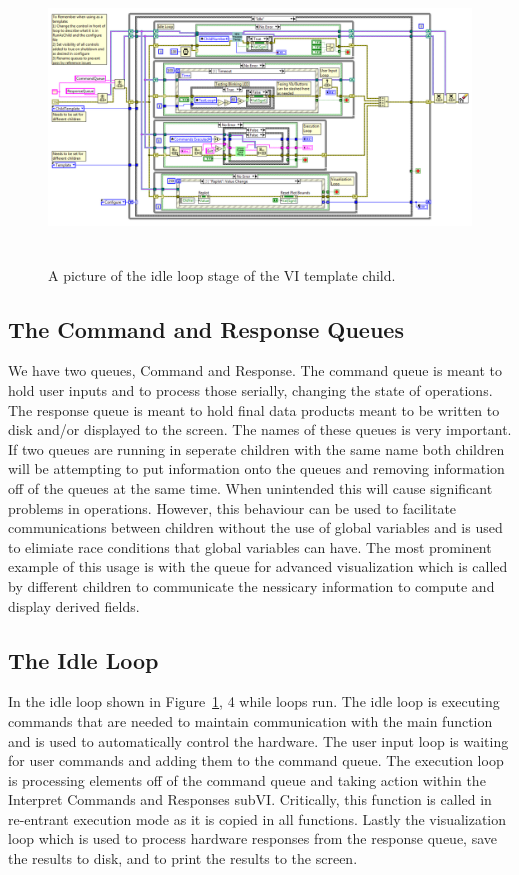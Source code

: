 \begin{figure}[!ht]\centering
\includegraphics[height=3in]{Figures/MainVITemplateBackPanel}
\caption{A picture of the idle loop stage of the VI template child.}
\label{Fig:VITemplateBP}
\end{figure}

\subsection{The Command and Response Queues}

We have two queues, Command and Response. The command queue is meant to hold user inputs and to process those serially, changing the state of operations. The response queue is meant to hold final data products meant to be written to disk and/or displayed to the screen. The names of these queues is very important. If two queues are running in seperate children with the same name both children will be attempting to put information onto the queues and removing information off of the queues at the same time. When unintended this will cause significant problems in operations. However, this behaviour can be used to facilitate communications between children without the use of global variables and is used to elimiate race conditions that global variables can have. The most prominent example of this usage is with the queue for advanced visualization which is called by different children to communicate the nessicary information to compute and display derived fields.  

\subsection{The Idle Loop}

In the idle loop shown in Figure~\ref{Fig:VITemplateBP}, 4 while loops run. The idle loop is executing commands that are needed to maintain communication with the main function and is used to automatically control the hardware. The user input loop is waiting for user commands and adding them to the command queue. The execution loop is processing elements off of the command queue and taking action within the Interpret Commands and Responses subVI. Critically, this function is called in re-entrant execution mode as it is copied in all functions. Lastly the visualization loop which is used to process hardware responses from the response queue, save the results to disk, and to print the results to the screen. 

